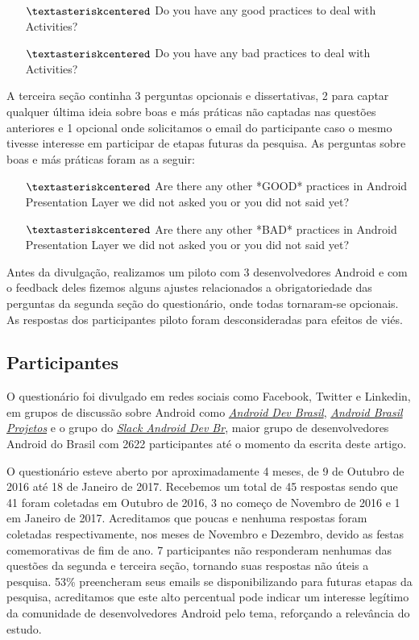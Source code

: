 \begin{itemize} 
	\item[$\textasteriskcentered$] Do you have any good practices to deal with Activities?
	\item[$\textasteriskcentered$] Do you have any bad practices to deal with Activities? 
\end{itemize}

A terceira se\c{c}\~ao continha 3 perguntas opcionais e dissertativas, 2 para captar qualquer \'ultima ideia sobre boas e m\'as pr\'aticas n\~ao captadas nas quest\~oes anteriores e 1 opcional onde solicitamos o email do participante caso o mesmo tivesse interesse em participar de etapas futuras da pesquisa. As perguntas sobre boas e m\'as pr\'aticas foram as a seguir: 

\begin{itemize} 
	\item[$\textasteriskcentered$] Are there any other *GOOD* practices in Android Presentation Layer we did not asked you or you did not said yet?
	\item[$\textasteriskcentered$] Are there any other *BAD* practices in Android Presentation Layer we did not asked you or you did not said yet?
\end{itemize}

Antes da divulga\c{c}\~ao, realizamos um piloto com 3 desenvolvedores Android e com o feedback deles fizemos alguns ajustes relacionados a obrigatoriedade das perguntas da segunda se\c{c}\~ao do question\'ario, onde todas tornaram-se opcionais. As respostas dos participantes piloto foram desconsideradas para efeitos de vi\'es. 

\subsection{Participantes}
\label{sub:participantes}

O question\'ario foi divulgado em redes sociais como Facebook, Twitter e Linkedin, em grupos de discuss\~ao sobre Android como \href{https://groups.google.com/forum/#!forum/androidbrasil-dev}{\textit{Android Dev Brasil}}, \href{https://groups.google.com/forum/\#!forum/android-brasil-projetos}{\textit{Android Brasil Projetos}} e o grupo do \href{http://slack.androiddevbr.org/}{\textit{Slack Android Dev Br}}, maior grupo de desenvolvedores Android do Brasil com 2622 participantes at\'e o momento da escrita deste artigo. 

O question\'ario esteve aberto por aproximadamente 4 meses, de 9 de Outubro de 2016 at\'e 18 de Janeiro de 2017. Recebemos um total de 45 respostas sendo que 41 foram coletadas em Outubro de 2016, 3 no come\c{c}o de Novembro de 2016 e 1 em Janeiro de 2017. Acreditamos que poucas e nenhuma respostas foram coletadas respectivamente, nos meses de Novembro e Dezembro, devido as festas comemorativas de fim de ano. 7 participantes n\~ao responderam nenhumas das questões da segunda e terceira se\c{c}\~ao, tornando suas respostas n\~ao \'uteis a pesquisa. 53\% preencheram seus emails se disponibilizando para futuras etapas da pesquisa, acreditamos que este alto percentual pode indicar um interesse leg\'itimo da comunidade de desenvolvedores Android pelo tema, refor\c{c}ando a relev\^ancia do estudo. 

